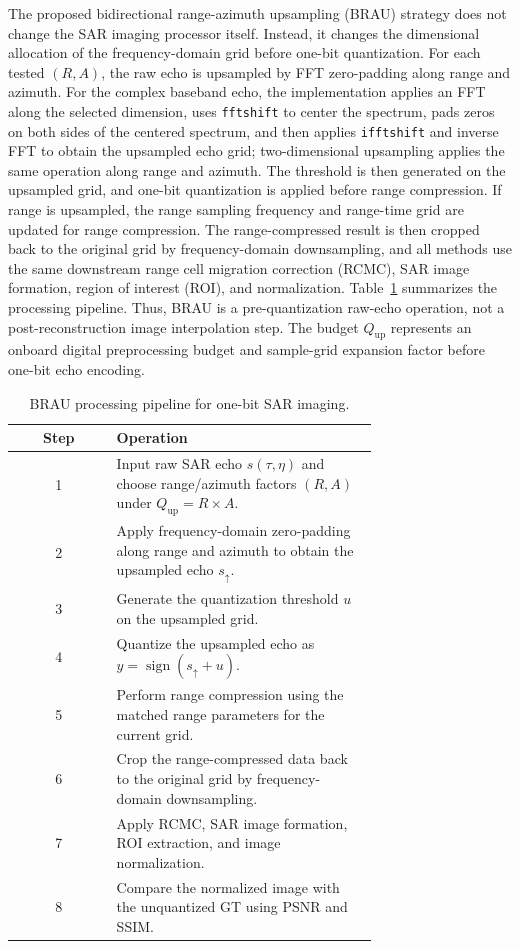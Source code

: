\documentclass[conference]{IEEEtran}
\begin{document}
The proposed bidirectional range-azimuth upsampling (BRAU) strategy does not change the SAR imaging processor itself. Instead, it changes the dimensional allocation of the frequency-domain grid before one-bit quantization. For each tested $(R,A)$, the raw echo is upsampled by FFT zero-padding along range and azimuth. For the complex baseband echo, the implementation applies an FFT along the selected dimension, uses \texttt{fftshift} to center the spectrum, pads zeros on both sides of the centered spectrum, and then applies \texttt{ifftshift} and inverse FFT to obtain the upsampled echo grid; two-dimensional upsampling applies the same operation along range and azimuth. The threshold is then generated on the upsampled grid, and one-bit quantization is applied before range compression. If range is upsampled, the range sampling frequency and range-time grid are updated for range compression. The range-compressed result is then cropped back to the original grid by frequency-domain downsampling, and all methods use the same downstream range cell migration correction (RCMC), SAR image formation, region of interest (ROI), and normalization. Table~\ref{alg:brau} summarizes the processing pipeline. Thus, BRAU is a pre-quantization raw-echo operation, not a post-reconstruction image interpolation step. The budget $Q_{\mathrm{up}}$ represents an onboard digital preprocessing budget and sample-grid expansion factor before one-bit echo encoding.

\begin{table}[t]
\caption{BRAU processing pipeline for one-bit SAR imaging.}
\label{alg:brau}
\begin{center}
\scriptsize
\setlength{\tabcolsep}{3pt}
\begin{tabular}{c p{0.72\linewidth}}
\hline
Step & Operation \\
\hline
1 & Input raw SAR echo $s(\tau,\eta)$ and choose range/azimuth factors $(R,A)$ under $Q_{\mathrm{up}}=R\times A$. \\
2 & Apply frequency-domain zero-padding along range and azimuth to obtain the upsampled echo $s_{\uparrow}$. \\
3 & Generate the quantization threshold $u$ on the upsampled grid. \\
4 & Quantize the upsampled echo as $y=\operatorname{sign}(s_{\uparrow}+u)$. \\
5 & Perform range compression using the matched range parameters for the current grid. \\
6 & Crop the range-compressed data back to the original grid by frequency-domain downsampling. \\
7 & Apply RCMC, SAR image formation, ROI extraction, and image normalization. \\
8 & Compare the normalized image with the unquantized GT using PSNR and SSIM. \\
\hline
\end{tabular}
\end{center}
\end{table}
\end{document}
